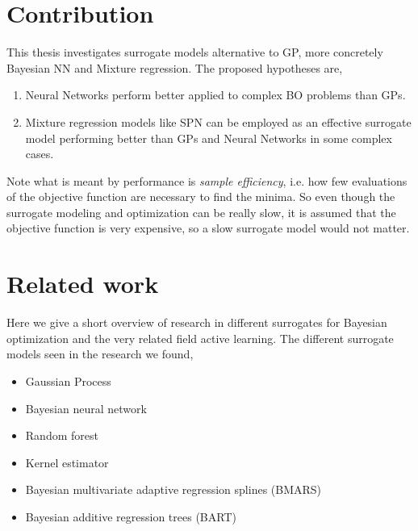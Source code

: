 \section{Contribution}
This thesis investigates surrogate models alternative to GP, more concretely Bayesian NN
and Mixture regression. The proposed hypotheses are,
\begin{enumerate}
    \item Neural Networks perform better applied to complex BO problems than GPs.
    \item Mixture regression models like SPN can be employed as an effective surrogate model
    performing better than GPs and Neural Networks in some complex cases. 
\end{enumerate}

Note what is meant by performance is \textit{sample efficiency}, i.e. how few evaluations of the objective function
are necessary to find the minima. So even though the surrogate modeling and optimization can be really slow, 
it is assumed that the objective function is very expensive, so a slow surrogate model would not matter.

    

\section{Related work}
Here we give a short overview of research in different surrogates for Bayesian optimization
and the very related field active learning. The different surrogate models seen in the 
research we found, 
\begin{itemize}
    \item Gaussian Process
    \item Bayesian neural network
    \item Random forest
    \item Kernel estimator
    \item Bayesian multivariate adaptive regression splines (BMARS)
    \item Bayesian additive regression trees (BART)
\end{itemize}

